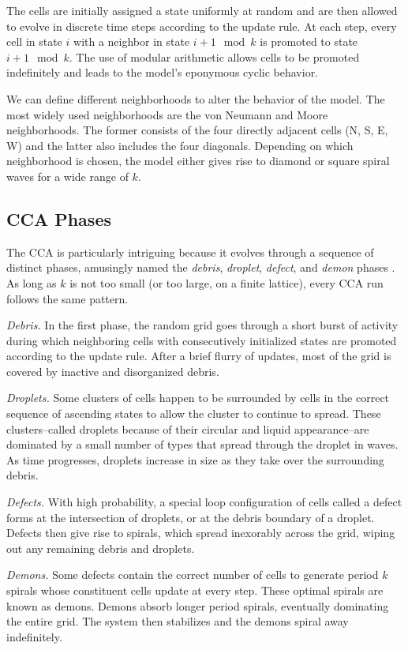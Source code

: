 \documentclass[%
 amsmath,amssymb,
 aps,
]{revtex4-1}
\begin{document}
The cells are initially assigned a state uniformly at random and are then allowed to evolve in discrete time steps according to the update rule. At each step, every cell in state $i$ with a neighbor in state $i+1 \mod k$ is promoted to state $i + 1 \mod k$. The use of modular arithmetic allows cells to be promoted indefinitely and leads to the model's eponymous cyclic behavior.

We can define different neighborhoods to alter the behavior of the model. The most widely used neighborhoods are the von Neumann and Moore neighborhoods. The former consists of the four directly adjacent cells (N, S, E, W) and the latter also includes the four diagonals. Depending on which neighborhood is chosen, the model either gives rise to diamond or square spiral waves for a wide range of $k$. 

\subsection{CCA Phases}
The CCA is particularly intriguing because it evolves through a sequence of distinct phases, amusingly named the \emph{debris}, \emph{droplet}, \emph{defect}, and \emph{demon} phases \cite{Fisch1991}. As long as $k$ is not too small (or too large, on a finite lattice), every CCA run follows the same pattern.

\emph{Debris.} In the first phase, the random grid goes through a short burst of activity during which neighboring cells with consecutively initialized states are promoted according to the update rule. After a brief flurry of updates, most of the grid is covered by inactive and disorganized debris. 

\emph{Droplets.} Some clusters of cells happen to be surrounded by cells in the correct sequence of ascending states to allow the cluster to continue to spread. These clusters--called droplets because of their circular and liquid appearance--are dominated by a small number of types that spread through the droplet in waves. As time progresses, droplets increase in size as they take over the surrounding debris. 

\emph{Defects.} With high probability, a special loop configuration of cells called a defect forms at the intersection of droplets, or at the debris boundary of a droplet. Defects then give rise to spirals, which spread inexorably across the grid, wiping out any remaining debris and droplets.

\emph{Demons.} Some defects contain the correct number of cells to generate period $k$ spirals whose constituent cells update at every step. These optimal spirals are known as demons. Demons absorb longer period spirals, eventually dominating the entire grid. The system then stabilizes and the demons spiral away indefinitely.
\end{document}
